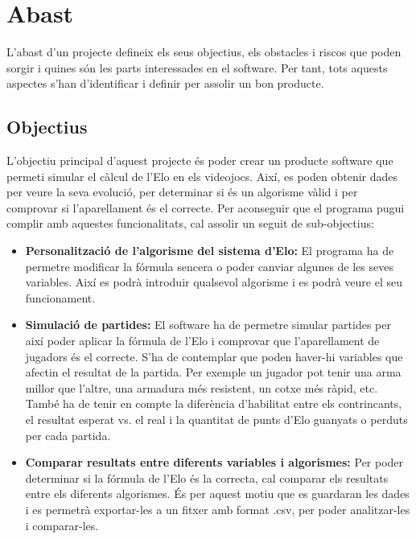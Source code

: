 \documentclass[a4paper]{article}
\begin{document}
\newpage

\section{Abast}
L'abast d'un projecte defineix els seus objectius, els obstacles i riscos que poden sorgir i quines són les parts interessades en el software. Per tant, tots aquests aspectes s'han  d'identificar i definir per assolir un bon producte.

\subsection{Objectius}
L'objectiu principal d'aquest projecte és poder crear un producte software que permeti simular el càlcul de l'Elo en els videojocs. Així, es poden obtenir dades per veure la seva evolució, per determinar si és un algorisme vàlid i per comprovar si l'aparellament és el correcte. Per aconseguir que el programa pugui complir amb aquestes funcionalitats, cal assolir un seguit de sub-objectius:
\begin{itemize}
    \item \textbf{Personalització de l'algorisme del sistema d'Elo:} El programa ha de permetre modificar la fórmula sencera o poder canviar algunes de les seves variables. Així es podrà introduir qualsevol algorisme i es podrà veure el seu funcionament.
    
    \item \textbf{Simulació de partides:} El software ha de permetre simular partides per així poder aplicar la fórmula de l'Elo i comprovar que l'aparellament de jugadors és el correcte. S'ha de contemplar que poden haver-hi variables que afectin el resultat de la partida. Per exemple un jugador pot tenir una arma millor que l'altre, una armadura més resistent, un cotxe més ràpid, etc. També ha de tenir en compte la diferència d'habilitat entre els contrincants, el resultat esperat vs. el real i la quantitat de punts d'Elo guanyats o perduts per cada partida. 
    
    \item \textbf{Comparar resultats entre diferents variables i algorismes:} Per poder determinar si la fórmula de l'Elo és la correcta, cal comparar els resultats entre els diferents algorismes. És per aquest motiu que es guardaran les dades i es permetrà exportar-les a un fitxer amb format .csv, per poder analitzar-les i comparar-les.
\end{itemize}
\end{document}
